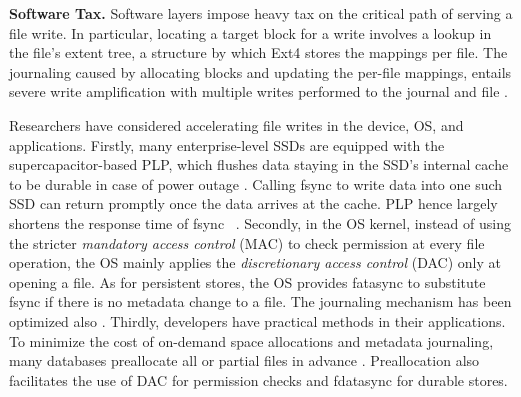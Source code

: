  

\textbf{Software Tax.}	
Software layers impose heavy tax on the critical path of serving a file write.
In particular, locating a target block for a write involves a lookup
in the file's extent tree, a structure by which Ext4 stores the  mappings per file. 
The journaling caused by allocating blocks and updating the per-file mappings,
 entails severe write amplification with multiple writes performed to  the journal and file \cite{lee2015waldio,fsync:iJournaling:ATC-2017,fsync:FastCommit:ATC-2024}.
 
Researchers have considered accelerating %
 file writes in the device, OS, and applications.
Firstly, many enterprise-level SSDs are equipped with the supercapacitor-based  PLP,
which flushes 
data %
staying in the SSD's internal cache to be durable in case of power outage \cite{PLP:samsung}.
Calling fsync to write data into one such SSD can return promptly 
once the data arrives at the cache.  PLP hence largely shortens the response time of fsync%
~\cite{fsync:barrierFS:FAST-2018}.
Secondly, in the OS kernel,
instead of using
the stricter {\em mandatory access control} (MAC) to check permission   %
at every file operation,
the OS mainly applies the  {\em discretionary access control} (DAC) only at opening a file. 
As for persistent stores,
the OS provides  fatasync to substitute fsync if there is no metadata change to a file.
The journaling mechanism has been optimized also \cite{fsync:RFLUSH:FAST-2018,fsync:rethink:OSDI-2006,FS:Z-Journal:ATC-2021,fsync:OptFS:SOSP-2013,fsync:TxFS:ATC-2018,fsync:FastCommit:ATC-2024}. 
Thirdly,  developers have practical methods in their applications.
To minimize the cost of on-demand space allocations and 
metadata journaling,   many databases
preallocate all or partial files in advance \cite{DB:OceanBase:VLDB-2022,MySQL:fallocate,SQL-server:fallocate}.  %
Preallocation
 also facilitates the use of DAC for permission checks   and
fdatasync for durable stores.

